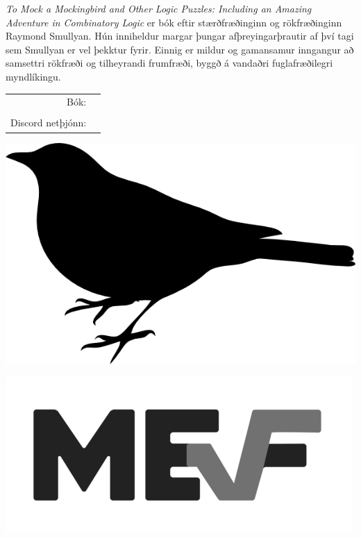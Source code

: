 \documentclass[letterpaper]{article}
\begin{document}


\emph{To Mock a Mockingbird and Other Logic Puzzles: Including an Amazing Adventure in Combinatory Logic} er bók eftir stærðfræðinginn og rökfræðinginn Raymond Smullyan. Hún inniheldur margar þungar afþreyingarþrautir af því tagi sem Smullyan er vel þekktur fyrir. Einnig er mildur og gamansamur inngangur að samsettri rökfræði og tilheyrandi frumfræði, byggð á vandaðri fuglafræðilegri myndlíkingu.

\vspace{0.75in}
\begin{tabular}{rl}
    \csctimefont Bók: &  \\
    & \\
    \csctimefont Discord netþjónn: &
\end{tabular}

\vspace{0.5in}
\begin{center}
\includegraphics[scale = 0.75]{mockingbird_logo.png}
\end{center}

\vspace{-15pt}
\vspace{-15pt}
\centering {}

\raggedleft
\includegraphics[scale = 0.5]{mef_logo.png}
\end{document}
